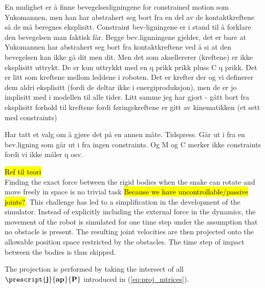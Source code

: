 En mulighet er å finne bevegelsesligningene for constrained motion som Yukomannen, men han har abstrahert seg bort fra en del av de kontaktkreftene så de må beregnes eksplisitt. Constraint bev-ligningene er i stand til å forklare den bevegelsen man faktisk får. Begge bev.lignningene gjelder, det er bare at Yukomannen har abstrahert seg bort fra kontaktkreftene ved å si at den bevegelsen kan ikke gå dit men dit. Men det som aksellererer (kreftene) er ikke eksplisitt uttrykt. De er kun uttrykkt med en q prikk prikk pluss C q prikk. Det er litt som kreftene mellom leddene i roboten. Det er krefter der og vi definerer dem aldri eksplisitt (fordi de deltar ikke i energiproduksjon), men de er jo implisitt med i modellen til alle tider. Litt samme jeg har gjort - gått bort fra eksplisitt forhold til kreftene fordi føringskreftene er gitt av kinematikken (et sett med constraints)

Har tatt et valg om å gjøre det på en annen måte. Tidspress. Går ut i fra en bev.ligning som går ut i fra ingen constraints. Og M og C merker ikke constraints fordi vi ikke måler q osv.


\hl{Ref til teori}\\
Finding the exact force between the rigid bodies when the snake can rotate and move freely in space is no trivial task \hl{Because we have uncontrollable/passive joints?}. This challenge has led to a simplification in the development of the simulator. Instead of explicitly including the external force in the dynamics, the movement of the robot is simulated for one time step under the assumption that no obstacle is present. The resulting joint velocities are then projected onto the allowable position space restricted by the obstacles. The time step of impact between the bodies is thus skipped.

The projection is performed by taking the intersect of all $\mathbf{\prescript{j}{ap}{P}}$ introduced in (\ref{eq:proj_mtrices}).